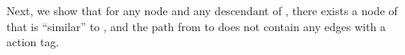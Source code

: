 \documentclass[11pt]{article}
\numberwithin{theorem}{section}
\begin{document}
\begin{comment}
\begin{proof}
 Fix  and  as in the hypothesis of the lemma.
 The proof is by induction on the distance from  to .
 
 \emph{Base Case.} Let the distance between  and  be . That is, . Trivially, we see that  satisfies the lemma.

 
 \emph{Inductive Hypothesis.}
 For every descendant  of  at a distance  from , there exists a descendant  of ,  
 such that , the suffix of  following  is identical to the suffix of  following , and the path  from  to  does not contain any edges whose action tag is .
 
 \emph{Inductive Step.} 
 Fix  to be a descendant of  at a distance  from . Let  be the parent of . Note that, by construction,  is a descendant of  at a distance  from .
 Let  be the label of the edge  connecting  and . 
 
 By the inductive hypothesis, there exists a descendant  of  
 such that , the suffix of  following  is identical to the suffix of  following , and the path from  to  does not contain any edge whose action tag is .
 
 If the action tag of edge  (connecting  and ) is , then by Lemma \ref{prop:botChild}, we know that  and . Let  be . Therefore,  is a descendant of  such that , the suffix of  following  is identical to the suffix of  following , and the path from  to  does not contain any edge whose action tag is , as needed.
 
 On the other hand, if the action tag of the edge  (connecting  and ) is not , then we apply Lemma \ref{lem:sameConfigSameChild} to fix  to be an -child of  and  to be the -edge connecting  and  such that , , and .
 By Lemma \ref{prop:nonBotChild},  and . Also recall that the suffix of  following  is identical to the suffix of  following . Therefore, the suffix of  following  is identical to the suffix of  following , as needed. 

 This completes the induction and the proof.
\end{proof}
\end{comment}

Next, we show that for any node  and any descendant  of , there exists a node  of  that is ``similar'' to , and the path from  to  does not contain any edges with a  action tag.
\end{document}
